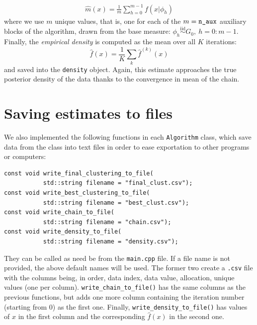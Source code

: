 \begin{equation}\label{margneal8}
	\begin{aligned}
		\hat m(x) = \frac{1}{m} \sum_{h=0}^{m-1}  f\left(x | \phi_h\right)
	\end{aligned}
\end{equation}
where we use $m$ unique values, that is, one for each of the $m = \verb|n_aux|$ auxiliary blocks of the algorithm, drawn from the base measure: $\phi_{h} \overset{\text{iid}}{\sim} G_0, \ h=0:m-1$. \\
Finally, the \emph{empirical density} is computed as the mean over all $K$ iterations:
$$
\hat f(x) = \frac{1}{K} \sum_k \hat f^{(k)}(x)
$$
and saved into the \verb|density| object.
Again, this estimate approaches the true posterior density of the data thanks to the convergence in mean of the chain.

\section{Saving estimates to files}
We also implemented the following functions in each \verb|Algorithm| class, which save data from the class into text files in order to ease exportation to other programs or computers:
\begin{verbatim}
const void write_final_clustering_to_file(
           std::string filename = "final_clust.csv");
const void write_best_clustering_to_file(
           std::string filename = "best_clust.csv");
const void write_chain_to_file(
           std::string filename = "chain.csv");
const void write_density_to_file(
           std::string filename = "density.csv");
\end{verbatim}
They can be called as need be from the \verb|main.cpp| file.
If a file name is not provided, the above default names will be used.
The former two create a \verb|.csv| file with the columns being, in order, data index, data value, allocation, unique values (one per column).
\verb|write_chain_to_file()| has the same columns as the previous functions, but adds one more column containing the iteration number (starting from $0$) as the first one.
Finally, \verb|write_density_to_file()| has values of $x$ in the first column and the corresponding $\hat f(x)$ in the second one.

\clearpage

